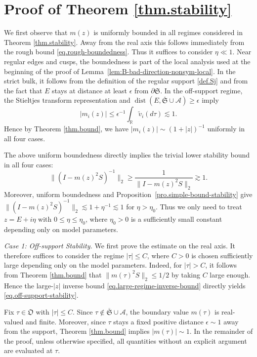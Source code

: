 \documentclass[11pt,twoside, a4paper]{article}
\numberwithin{equation}{section}
\numberwithin{figure}{section}
\theoremstyle{plain} %
\theoremstyle{definition}
\theoremstyle{remark}
\newcommand{\1} {\mspace{1 mu}}
\newcommand{\2} {\mspace{2 mu}}
\DeclareMathOperator{\dist}{dist}
\begin{document}
\section{Proof of Theorem \ref{thm.stability}}

We first observe that \(m(z)\) is uniformly bounded in all regimes considered in Theorem \ref{thm.stability}.
Away from the real axis this follows immediately from the rough bound
\eqref{eq.rough-boundedness}. Thus it suffices to consider \(\eta\ll1\). Near regular
edges and cusps, the boundedness is part of the local analysis used at the beginning of
the proof of Lemma~\ref{lem:B-bad-direction-nonsym-local}. In the strict bulk, it follows
from the definition of the regular support \eqref{def.Sj} and from the fact that
\(E\) stays at distance at least \(\epsilon\) from \(\partial\mathfrak S\). In the
off-support regime, the Stieltjes transform representation and
\(\dist(E,\overline{\mathfrak S}\cup\mathcal{A})\ge\epsilon\) imply 
\[
    |m_i(z)|
    \le
    \epsilon^{-1}\int_{\mathbb R}\tilde v_i(d\tau)\lesssim 1.
\]
Hence by Theorem \ref{thm.bound}, we have $|m_i(z)|\sim (1+|z|)^{-1}$ uniformly in all four cases.

The above uniform boundedness directly implies the trivial lower stability bound in all four cases: 
\begin{equation}\label{eq.stability-lower-bound}
    \bigl\|(I-m(z)^2S)^{-1}\bigr\|_2
    \ge
    \frac{1}{\|I-m(z)^2S\|_2}
    \gtrsim 1 .
\end{equation}
Moreover, uniform boundedness and Proposition~\ref{pro.simple-bound-stability} give
$
    \|(I-m(z)^2S)^{-1}\|_2
    \lesssim 1+\eta^{-1}
    \lesssim 1 
$
for $\eta>\eta_0$.
Thus we only need to treat \(z=E+i\eta\) with \(0\le \eta\le \eta_0\), where \(\eta_0>0\) is a sufficiently small constant depending only on model parameters.
\medskip


\textit{Case 1: Off-support Stability.}
We first prove the estimate on the real axis. 
It therefore suffices to consider the regime $|\tau|\le C$, where $C>0$ is chosen sufficiently large depending only on the model parameters. Indeed, for $|\tau|>C$, it follows from Theorem \ref{thm.bound} that
$
\|m(\tau)^2 S\|_2\le 1/2
$
by taking $C$ large enough. Hence the large-$|z|$ inverse bound \eqref{eq.large-regime-inverse-bound} directly yields \eqref{eq.off-support-stability}.

Fix \(\tau\in\mathfrak O\) with $|\tau|\le C$. Since \(\tau\notin\overline{\mathfrak S}\cup\mathcal{A}\), the boundary value \(m(\tau)\) is real-valued and finite. Moreover, since $\tau$ stays a fixed positive distance $\epsilon\sim 1$ away from the support, Theorem \ref{thm.bound} implies $|m(\tau)|\sim 1$. In the remainder of the proof, unless otherwise specified, all quantities without an explicit argument are evaluated at \(\tau\).
\end{document}
